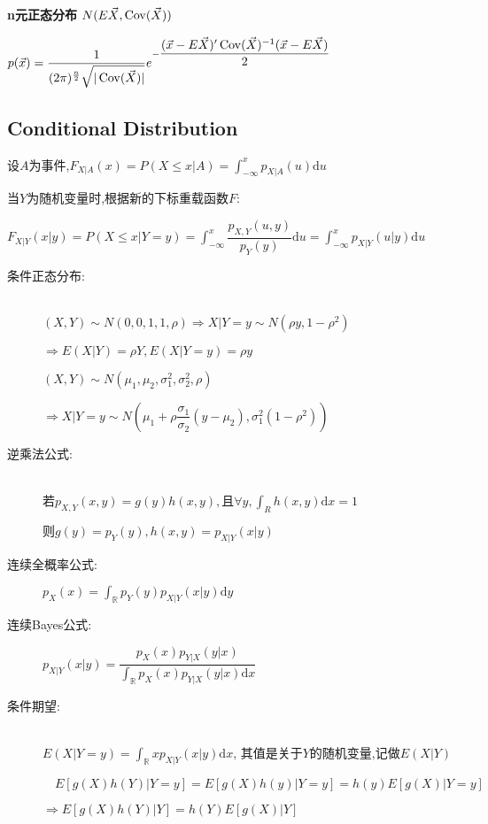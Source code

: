 \textbf{n元正态分布} $ N(E\vec{X},\operatorname{Cov}(\vec{X}))$

$ p(\vec{x})=\dfrac{1}{(2\pi)^{\frac{n}{2}}\sqrt{|\operatorname{Cov}(\vec{X})|}}e^{-\dfrac{(\vec{x}-E\vec{X})'\operatorname{Cov}(\vec{X})^{-1}(\vec{x}-E\vec{X})}{2}}$

\subsection{Conditional Distribution}
设$ A$为事件,$ F_{X|A}(x)=P(X\le x|A) = \int_{-\infty}^{x}p_{X|A}(u)\mathrm{d}u$

当$ Y$为随机变量时,根据新的下标重载函数$ F$:

$ F_{X|Y}(x|y) = P(X\le x|Y=y)=\int_{-\infty}^x{\dfrac{p_{X,Y}(u,y)}{p_Y(y)}\mathrm{d}u}=\int_{-\infty}^x{ p_{X|Y}(u|y)}\mathrm{d}u$
\begin{description}
  \item [条件正态分布:]\hfill\\
    \quad $ (X,Y)\sim N(0,0,1,1,\rho)\Rightarrow X|Y=y \sim N(\rho y, 1-\rho^2)$

    $\Rightarrow  E(X|Y) = \rho Y, E(X|Y=y) = \rho y$

    \quad$ (X,Y) \sim N(\mu_1, \mu_2, \sigma_1^2, \sigma_2^2, \rho) $

  $\Rightarrow  X|Y=y \sim N(\mu_1+\rho\dfrac{\sigma_1}{\sigma_2}(y-\mu_2), \sigma_1^2(1-\rho^2))$

  \item [逆乘法公式:]\hfill\\
    若$p_{X,Y}(x,y) = g(y)h(x,y),且\forall y, \int_{R}h(x,y)\mathrm{d}x=1$

    $则g(y) = p_Y(y), h(x,y) = p_{X|Y}(x|y)$

  \item [连续全概率公式:] $ p_X(x) = \int_{\mathbb{R}}{p_Y(y)p_{X|Y}(x|y)\mathrm{d}y}$

  \item[连续Bayes公式:]$ p_{X|Y}(x|y) = \dfrac{p_X(x)p_{Y|X}(y|x)}{\int_{\mathbb{R}}{p_X(x)p_{Y|X}(y|x)}\mathrm{d}x}$

  \item[条件期望:]\hfill\\
    $ E(X|Y=y) = \int_{\mathbb{R}}{xp_{X|Y}(x|y)\mathrm{d}x}$, 其值是关于$ Y$的随机变量,记做$E(X|Y) $

    $\quad E[g(X)h(Y)|Y=y] = E[g(X)h(y)|Y=y] = h(y) E[g(X)|Y=y]$

  $\Rightarrow E[g(X)h(Y)|Y] = h(Y)E[g(X)|Y]$


\end{description}
